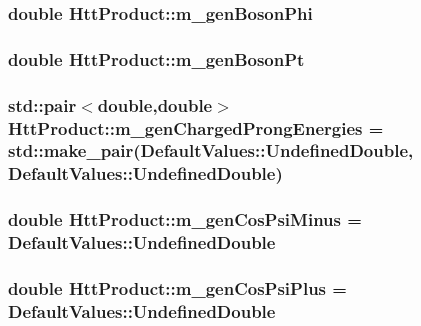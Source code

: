 \label{classHttProduct_a0c74881d1d4b145b91ec71d49e18fa63}
\hypertarget{classHttProduct_aebef7da9d392e74d5a2f9ed5ccbc1b0e}{
\subsubsection[{m\_\-genBosonPhi}]{\setlength{\rightskip}{0pt plus 5cm}double {\bf HttProduct::m\_\-genBosonPhi}}}
\label{classHttProduct_aebef7da9d392e74d5a2f9ed5ccbc1b0e}
\hypertarget{classHttProduct_af396cb9db5d26bff1fc6950b75fe8a69}{
\subsubsection[{m\_\-genBosonPt}]{\setlength{\rightskip}{0pt plus 5cm}double {\bf HttProduct::m\_\-genBosonPt}}}
\label{classHttProduct_af396cb9db5d26bff1fc6950b75fe8a69}
\hypertarget{classHttProduct_a6f852191cf4b853424e8b4c4b3202160}{
\subsubsection[{m\_\-genChargedProngEnergies}]{\setlength{\rightskip}{0pt plus 5cm}std::pair$<$double,double$>$ {\bf HttProduct::m\_\-genChargedProngEnergies} = std::make\_\-pair(DefaultValues::UndefinedDouble, DefaultValues::UndefinedDouble)}}
\label{classHttProduct_a6f852191cf4b853424e8b4c4b3202160}
\hypertarget{classHttProduct_a8c5dc87b3c1234c92106729e42bc49d0}{
\subsubsection[{m\_\-genCosPsiMinus}]{\setlength{\rightskip}{0pt plus 5cm}double {\bf HttProduct::m\_\-genCosPsiMinus} = DefaultValues::UndefinedDouble}}
\label{classHttProduct_a8c5dc87b3c1234c92106729e42bc49d0}
\hypertarget{classHttProduct_ac16132a7c669ebff09cb300be554a4c8}{
\subsubsection[{m\_\-genCosPsiPlus}]{\setlength{\rightskip}{0pt plus 5cm}double {\bf HttProduct::m\_\-genCosPsiPlus} = DefaultValues::UndefinedDouble}}
